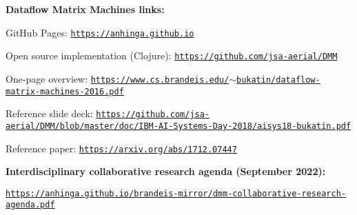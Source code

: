 \documentclass{article}
\begin{document}
\vspace{0.2in}
\noindent
{\bf Dataflow Matrix Machines links:}

\vspace{0.1in}
GitHub Pages: \href{https://anhinga.github.io/}{\tt https://anhinga.github.io}

\vspace{0.1in}
Open source implementation (Clojure): \href{https://github.com/jsa-aerial/DMM}{\tt https://github.com/jsa-aerial/DMM}

\vspace{0.1in}
One-page overview: \href{https://www.cs.brandeis.edu/~bukatin/dataflow-matrix-machines-2016.pdf}{\tt https://www.cs.brandeis.edu/$\sim$bukatin/dataflow-matrix-machines-2016.pdf}

\vspace{0.1in}
Reference slide deck: \href{https://github.com/jsa-aerial/DMM/blob/master/doc/IBM-AI-Systems-Day-2018/aisys18-bukatin.pdf}{\scriptsize\tt https://github.com/jsa-aerial/DMM/blob/master/doc/IBM-AI-Systems-Day-2018/aisys18-bukatin.pdf}

\vspace{0.1in}
Reference paper: \href{https://arxiv.org/abs/1712.07447}{\tt https://arxiv.org/abs/1712.07447}

\vspace{0.3in}
\noindent
{\bf Interdisciplinary collaborative research agenda (September 2022):}

\vspace{0.1in}
\href{https://anhinga.github.io/brandeis-mirror/dmm-collaborative-research-agenda.pdf}{\tt https://anhinga.github.io/brandeis-mirror/dmm-collaborative-research-agenda.pdf}
\end{document}

